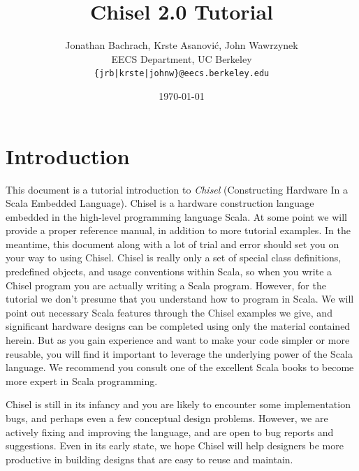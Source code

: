 \documentclass[twocolumn,10pt]{article}
\title{Chisel 2.0 Tutorial}
\author{Jonathan Bachrach, Krste Asanovi\'{c}, John Wawrzynek \\
EECS Department, UC Berkeley\\
{\tt  \{jrb|krste|johnw\}@eecs.berkeley.edu}
}
\date{\today}
\begin{document}
\maketitle{}


\section{Introduction}

This document is a tutorial introduction to {\em Chisel} (Constructing
Hardware In a Scala Embedded Language).  Chisel is a hardware
construction language embedded in the high-level programming language
Scala.  At some point we will provide a proper reference manual, in
addition to more tutorial examples.  In the meantime, this document
along with a lot of trial and error should set you on your way to
using Chisel.  Chisel is really only a set of special class
definitions, predefined objects, and usage conventions within Scala,
so when you write a Chisel program you are actually writing a Scala
program.  However, for the tutorial we don't presume that you
understand how to program in Scala.  We will point out necessary Scala
features through the Chisel examples we give, and significant hardware
designs can be completed using only the material contained herein.
But as you gain experience and want to make your code simpler or more
reusable, you will find it important to leverage the underlying power
of the Scala language. We recommend you consult one of the excellent
Scala books to become more expert in Scala programming.

Chisel is still in its infancy and you are likely to encounter some
implementation bugs, and perhaps even a few conceptual design
problems.  However, we are actively fixing and improving the language,
and are open to bug reports and suggestions.  Even in its early state,
we hope Chisel will help designers be more productive in building
designs that are easy to reuse and maintain.
\end{document}
